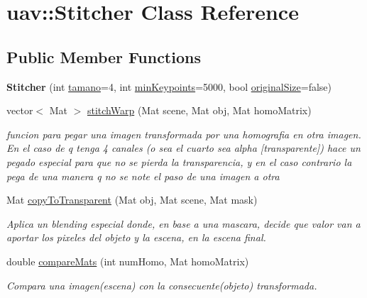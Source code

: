 \hypertarget{classuav_1_1Stitcher}{}\section{uav\+:\+:Stitcher Class Reference}
\label{classuav_1_1Stitcher}
\subsection*{Public Member Functions}
\begin{DoxyCompactItemize}
\item 
\mbox{\label{classuav_1_1Stitcher_ac106b49de9c5d1162ff97a0f6d96d59c}} 
{\bfseries Stitcher} (int \mbox{\hyperlink{classuav_1_1Stitcher_aecfe8592eb3d8445c0f3e8b722558acb}{tamano}}=4, int \mbox{\hyperlink{classuav_1_1Stitcher_a3b54e9be9bda44c4a04b14a645bd9521}{min\+Keypoints}}=5000, bool \mbox{\hyperlink{classuav_1_1Stitcher_a222f8247abb4fafba61d86078d8f9c16}{original\+Size}}=false)
\item 
vector$<$ Mat $>$ \mbox{\hyperlink{classuav_1_1Stitcher_a096e8020a5544325400743836c8ba58d}{stitch\+Warp}} (Mat scene, Mat obj, Mat homo\+Matrix)
\begin{DoxyCompactList}\small\item\em funcion para pegar una imagen transformada por una homografia en otra imagen. En el caso de q tenga 4 canales (o sea el cuarto sea alpha \mbox{[}transparente\mbox{]}) hace un pegado especial para que no se pierda la transparencia, y en el caso contrario la pega de una manera q no se note el paso de una imagen a otra \end{DoxyCompactList}\item 
Mat \mbox{\hyperlink{classuav_1_1Stitcher_a16bfb7a49f1e3a9c38ef03d72969094d}{copy\+To\+Transparent}} (Mat obj, Mat scene, Mat mask)
\begin{DoxyCompactList}\small\item\em Aplica un blending especial donde, en base a una mascara, decide que valor van a aportar los pixeles del objeto y la escena, en la escena final. \end{DoxyCompactList}\item 
double \mbox{\hyperlink{classuav_1_1Stitcher_a0745fd6db5669c1f9bce1b637c2be163}{compare\+Mats}} (int num\+Homo, Mat homo\+Matrix)
\begin{DoxyCompactList}\small\item\em Compara una imagen(escena) con la consecuente(objeto) transformada. \end{DoxyCompactList}\item 

\end{DoxyCompactItemize}

